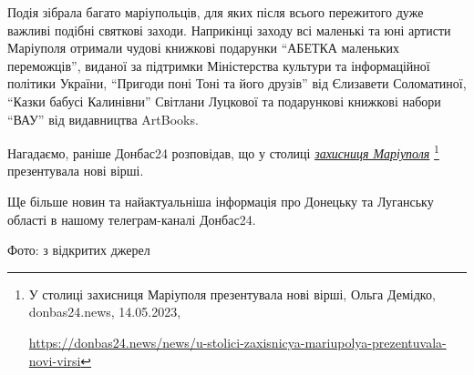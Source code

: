 
Подія зібрала багато маріупольців, для яких після всього пережитого дуже
важливі подібні святкові заходи. Наприкінці заходу всі маленькі та юні артисти
Маріуполя отримали чудові книжкові подарунки \enquote{АБЕТКА маленьких переможців},
виданої за підтримки Міністерства культури та інформаційної політики України,
\enquote{Пригоди поні Тоні та його друзів} від Єлизавети Соломатиної, \enquote{Казки бабусі
Калинівни} Світлани Луцкової та подарункові книжкові набори \enquote{ВАУ} від
видавництва ArtBooks.


Нагадаємо, раніше Донбас24 розповідав, що у столиці \href{https://donbas24.news/news/u-stolici-zaxisnicya-mariupolya-prezentuvala-novi-virsi}{\emph{захисниця Маріуполя}}%
\footnote{У столиці захисниця Маріуполя презентувала нові вірші, Ольга Демідко, donbas24.news, 14.05.2023, \par\url{https://donbas24.news/news/u-stolici-zaxisnicya-mariupolya-prezentuvala-novi-virsi}}
презентувала нові вірші.

Ще більше новин та найактуальніша інформація про Донецьку та Луганську області
в нашому телеграм-каналі Донбас24.

Фото: з відкритих джерел


